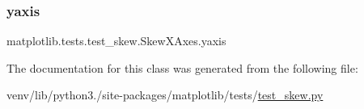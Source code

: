 \subsubsection{\texorpdfstring{yaxis}{yaxis}}
{\footnotesize\ttfamily matplotlib.\+tests.\+test\+\_\+skew.\+Skew\+X\+Axes.\+yaxis}



The documentation for this class was generated from the following file\+:\begin{DoxyCompactItemize}
\item 
venv/lib/python3./site-\/packages/matplotlib/tests/\hyperlink{test__skew_8py}{test\+\_\+skew.\+py}\end{DoxyCompactItemize}
